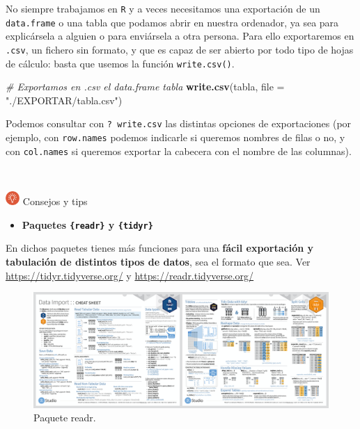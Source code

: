 \documentclass[11pt,]{book}
\newenvironment{Shaded}{\begin{snugshade}}{\end{snugshade}}
\newcommand{\CommentTok}[1]{\textcolor[rgb]{0.37,0.37,0.37}{\textit{#1}}}
\newcommand{\DataTypeTok}[1]{\textcolor[rgb]{0.27,0.27,0.27}{#1}}
\newcommand{\KeywordTok}[1]{\textcolor[rgb]{0.27,0.27,0.27}{\textbf{#1}}}
\newcommand{\NormalTok}[1]{#1}
\newcommand{\StringTok}[1]{\textcolor[rgb]{0.5,0.5,0.5}{#1}}
\providecommand{\tightlist}{%
  \setlength{\itemsep}{0pt}\setlength{\parskip}{0pt}}
\begin{document}
No siempre trabajamos en \texttt{R} y a veces necesitamos una exportación de un \texttt{data.frame} o una tabla que podamos abrir en nuestra ordenador, ya sea para explicársela a alguien o para enviársela a otra persona. Para ello exportaremos en \texttt{.csv}, un fichero sin formato, y que es capaz de ser abierto por todo tipo de hojas de cálculo: basta que usemos la función \texttt{write.csv()}.

\begin{Shaded}
\begin{Highlighting}[]
\CommentTok{# Exportamos en .csv el data.frame tabla}
\KeywordTok{write.csv}\NormalTok{(tabla, }\DataTypeTok{file =} \StringTok{"./EXPORTAR/tabla.csv"}\NormalTok{)}
\end{Highlighting}
\end{Shaded}

Podemos consultar con \texttt{?\ write.csv} las distintas opciones de exportaciones (por ejemplo, con \texttt{row.names} podemos indicarle si queremos nombres de filas o no, y con \texttt{col.names} si queremos exportar la cabecera con el nombre de las columnas).

~

\includegraphics[width=0.04\textwidth,height=\textheight]{img/logo_info.png} Consejos y tips

\begin{itemize}
\tightlist
\item
  \textbf{Paquetes \texttt{\{readr\}} y \texttt{\{tidyr\}}}
\end{itemize}

En dichos paquetes tienes más funciones para una \textbf{fácil exportación y tabulación de distintos tipos de datos}, sea el formato que sea. Ver \url{https://tidyr.tidyverse.org/} y \url{https://readr.tidyverse.org/}

\begin{figure}

{\centering \includegraphics[width=0.95\linewidth]{./img/readr} 

}

\caption{Paquete readr.}\label{fig:paquete-readr}
\end{figure}
\end{document}
